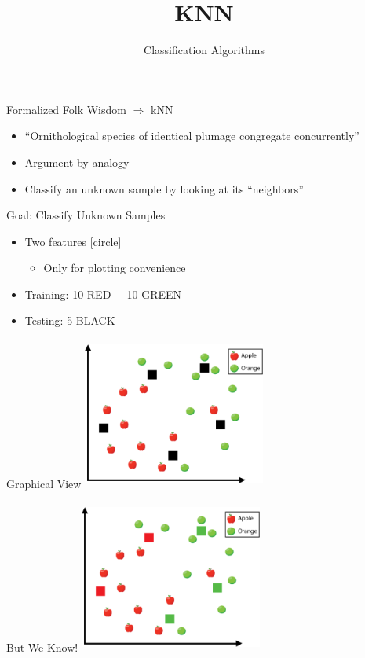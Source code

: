 \documentclass[aspectratio=169,14pt,usenames,dvipsnames]{beamer}
\title[KNN]{KNN}
\begin{document}
{\1
\begin{frame} \vspace{35pt}
	\subtitle{Classification Algorithms}
	\maketitle
\end{frame}
}


\begin{frame}{Formalized Folk Wisdom $\Rightarrow$  kNN}
\begin{itemize}
\item “Ornithological species of identical plumage congregate concurrently”
\item Argument by analogy
\item Classify an unknown sample by looking at its “neighbors”
\end{itemize}
\end{frame}

\begin{frame}{Goal: Classify Unknown Samples}
\begin{itemize}
\item Two features
[circle]
\begin{itemize}
\item Only for plotting convenience
\end{itemize}
\item Training: 10 RED + 10 GREEN
\item Testing: 5 BLACK
\end{itemize}
\end{frame}

\begin{frame}{Graphical View}
\centering
\includegraphics[width=6cm, height=5cm]{Images/4knn.png}
\end{frame}

\begin{frame}{But We Know!}
\centering
\includegraphics[width=6cm, height=5cm]{Images/5knn.png}
\end{frame}
\end{document}
